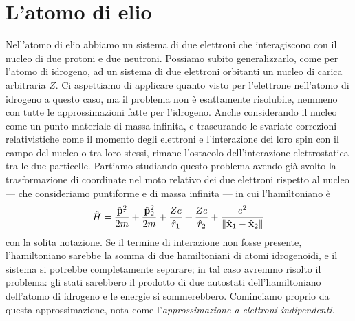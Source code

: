 \section{L'atomo di elio}
Nell'atomo di elio abbiamo un sistema di due elettroni che interagiscono con il nucleo di due protoni e due neutroni.
Possiamo subito generalizzarlo, come per l'atomo di idrogeno, ad un sistema di due elettroni orbitanti un nucleo di carica arbitraria $Z$.
Ci aspettiamo di applicare quanto visto per l'elettrone nell'atomo di idrogeno a questo caso, ma il problema non è esattamente risolubile, nemmeno con tutte le approssimazioni fatte per l'idrogeno.
Anche considerando il nucleo come un punto materiale di massa infinita, e trascurando le svariate correzioni relativistiche come il momento degli elettroni e l'interazione dei loro spin con il campo del nucleo o tra loro stessi, rimane l'ostacolo dell'interazione elettrostatica tra le due particelle.
Partiamo studiando questo problema avendo già svolto la trasformazione di coordinate nel moto relativo dei due elettroni rispetto al nucleo --- che consideriamo puntiforme e di massa infinita --- in cui l'hamiltoniano è
\begin{equation}
    \hat{H}=\frac{\hat{\mathbf{p}}_1^2}{2m}+\frac{\hat{\mathbf{p}}_2^2}{2m}+\frac{Ze}{\hat{r}_1}+\frac{Ze}{\hat{r}_2}+\frac{e^2}{\lVert\hat{\mathbf{x}}_1-\hat{\mathbf{x}}_2\rVert}
    \label{eq:H-elio}
\end{equation}
con la solita notazione.
Se il termine di interazione non fosse presente, l'hamiltoniano sarebbe la somma di due hamiltoniani di atomi idrogenoidi, e il sistema si potrebbe completamente separare; in tal caso avremmo risolto il problema: gli stati sarebbero il prodotto di due autostati dell'hamiltoniano dell'atomo di idrogeno e le energie si sommerebbero.
Cominciamo proprio da questa approssimazione, nota come l'\emph{approssimazione a elettroni indipendenti}.

